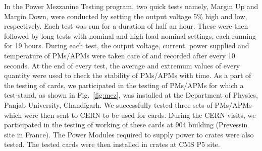 \begin{comment}
\begin{table}[!htbp]
 \centering
 \caption{Four stages of the long term ($\sim$ 39 hour) stability test performed to monitor the working of Power Mezzanines/Auxiliary Power Mezzanines (PMs/APMs).}
 \label{tab:PM_test}
 \vspace{2mm}
 \begin{tabular}{ll}
 \hline\hline
 \centering
 {\bf Test Stages}  & {\bf Duration (Hours)} \rbthm\\\hline
  Marginal Down     & ~~~~~~~~~~~1/2 \rbtrr \\
  Margin Up         & ~~~~~~~~~~~1/2 \rbtrr \\
  Nominal           & ~~~~~~~~~~~19  \rbtrr \\
  High Load Nominal & ~~~~~~~~~~~19  \rbtrr \\
 \hline\hline
 \end{tabular}
\end{table}
\end{comment}

In the Power Mezzanine Testing program, two quick tests namely, Margin Up and Margin Down, were conducted by setting the output voltage 5\% high and low, respectively. Each test was run for a duration of half an hour. These were then followed by long tests with nominal and high load nominal settings, each running for 19 hours. During each test, the output voltage, current, power supplied and temperature of PMs/APMs were taken care of and recorded after every 10 seconds. At the end of every test, the average and extremum values of every quantity were used to check the stability of PMs/APMs with time. As a part of the testing of \mhtr cards, we participated in the testing of PMs/APMs for which a test-stand, as shown in Fig.~\ref{fig:mez}, was installed at the Department of Physics, Panjab University, Chandigarh. We successfully tested three sets of PMs/APMs which were then sent to CERN to be used for \mhtr cards. During the CERN visits, we participated in the testing of working of these \mhtr cards at 904 building (Prevessin site in France). The Power Modules required to supply power to \mtca crates were also tested. The tested \mhtr cards were then installed in \mtca crates at CMS P5 site. 

